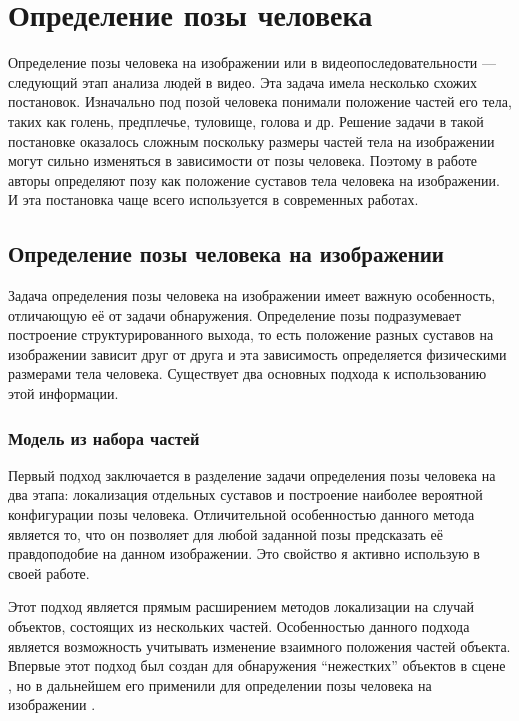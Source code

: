 \section{Определение позы человека} \label{chapt-related::human_pose_definithion}

Определение позы человека на изображении или в видеопоследовательности --- следующий этап анализа людей в видео. Эта задача имела несколько схожих постановок. Изначально под позой человека понимали положение частей его тела, таких как голень, предплечье, туловище, голова и др. Решение задачи в такой постановке оказалось сложным поскольку размеры частей тела на изображении могут сильно изменяться в зависимости от позы человека. Поэтому в работе \cite{yang2011articulated} авторы определяют позу как положение суставов тела человека на изображении. И эта постановка чаще всего используется в современных работах.

\subsection{Определение позы человека на изображении}

Задача определения позы человека на изображении имеет важную особенность, отличающую её от задачи обнаружения. Определение позы подразумевает построение структурированного выхода, то есть положение разных суставов на изображении зависит друг от друга и эта зависимость определяется физическими размерами тела человека. Существует два основных подхода к использованию этой информации.

\subsubsection{Модель из набора частей}

Первый подход заключается в разделение задачи определения позы человека на два этапа: локализация отдельных суставов и построение наиболее вероятной конфигурации позы человека. Отличительной особенностью данного метода является то, что он позволяет для любой заданной позы предсказать её правдоподобие на данном изображении. Это свойство я активно использую в своей работе.

Этот подход является прямым расширением методов локализации на случай объектов, состоящих из нескольких частей. Особенностью данного подхода является возможность учитывать изменение взаимного положения частей объекта. Впервые этот подход был создан для обнаружения ``нежестких'' объектов в сцене \cite{felzenszwalb2008discriminatively}, но в дальнейшем его применили для определении позы человека на изображении \cite{yang2011articulated}.

